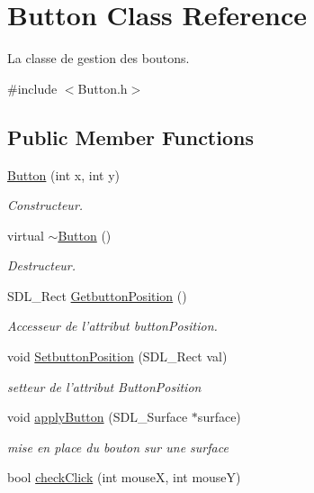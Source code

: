 \hypertarget{classButton}{\section{Button Class Reference}
\label{classButton}
}


La classe de gestion des boutons.  




{\ttfamily \#include $<$Button.\-h$>$}

\subsection*{Public Member Functions}
\begin{DoxyCompactItemize}
\item 
\hyperlink{classButton_a6e5fe59a2412635f037cdacdec3ffbf4}{Button} (int x, int y)
\begin{DoxyCompactList}\small\item\em Constructeur. \end{DoxyCompactList}\item 
virtual \hyperlink{classButton_a6d35cf666b119be6153a717427f9b5e2}{$\sim$\-Button} ()
\begin{DoxyCompactList}\small\item\em Destructeur. \end{DoxyCompactList}\item 
S\-D\-L\-\_\-\-Rect \hyperlink{classButton_ad1c08a85ce4226d52407bedac09faad4}{Getbutton\-Position} ()
\begin{DoxyCompactList}\small\item\em Accesseur de l'attribut button\-Position. \end{DoxyCompactList}\item 
void \hyperlink{classButton_ad0ebac62e6517157d7064798a0a6f79b}{Setbutton\-Position} (S\-D\-L\-\_\-\-Rect val)
\begin{DoxyCompactList}\small\item\em setteur de l'attribut Button\-Position \end{DoxyCompactList}\item 
void \hyperlink{classButton_ad8af591aa138c802d1708e772fab38e1}{apply\-Button} (S\-D\-L\-\_\-\-Surface $\ast$surface)
\begin{DoxyCompactList}\small\item\em mise en place du bouton sur une surface \end{DoxyCompactList}\item 
bool \hyperlink{classButton_a2a29ddfaae95ff59d44815c5a896d57b}{check\-Click} (int mouse\-X, int mouse\-Y)

\end{DoxyCompactItemize}
